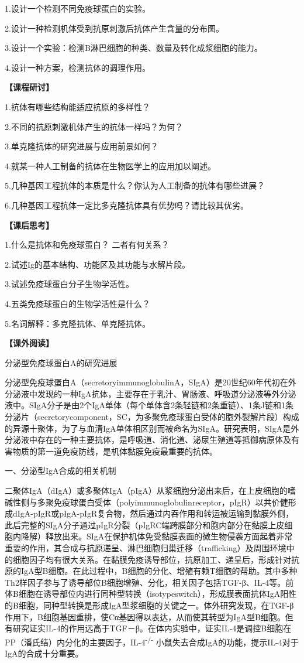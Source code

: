 1.设计一个检测不同免疫球蛋白的实验。

2.设计一种检测机体受到抗原刺激后抗体产生含量的分布图。

3.设计一个实验：检测B淋巴细胞的种类、数量及转化成浆细胞的能力。

4.设计一种方案，检测抗体的调理作用。

\noindent\textbf{【课程研讨】}

1.抗体有哪些结构能适应抗原的多样性？

2.不同的抗原刺激机体产生的抗体一样吗？为何？

3.单克隆抗体的研究进展与应用前景如何？

4.就某一种人工制备的抗体在生物医学上的应用加以阐述。

5.几种基因工程抗体的本质是什么？你认为人工制备的抗体有哪些进展？

6.几种基因工程抗体一定比多克隆抗体具有优势吗？请比较其优劣。

\noindent\textbf{【课后思考】}

1.什么是抗体和免疫球蛋白？ 二者有何关系？

2.试述Ig的基本结构、功能区及其功能与水解片段。

3.试述免疫球蛋白分子生物学活性。

4.五类免疫球蛋白的生物学活性是什么？

5.名词解释：多克隆抗体、单克隆抗体。

\noindent\textbf{【课外阅读】}

\begin{center}
{\Large 分泌型免疫球蛋白A的研究进展}
\end{center}
分泌型免疫球蛋白A（secretoryimmunoglobulinA，SIgA）是20世纪60年代初在外分泌液中发现的一种IgA抗体，主要存在于乳汁、胃肠液、呼吸道分泌液等外分泌液中。SIgA分子是由2个IgA单体（每个单体含2条轻链和2条重链）、1条J链和1条分泌片（secretorycomponent，SC，为多聚免疫球蛋白受体的胞外裂解片段）构成的异源十聚体，为了与血清IgA单体相区别而被命名为SIgA。研究表明，SIgA是外分泌液中存在的一种主要抗体，是呼吸道、消化道、泌尿生殖道等抵御病原体及有害物质的第一道免疫防线，是机体黏膜免疫最重要的抗体。

\begin{center}
{\large 一、分泌型IgA合成的相关机制}
\end{center}
二聚体IgA（dIgA）或多聚体IgA（pIgA）从浆细胞分泌出来后，在上皮细胞的嗜碱性侧与多聚免疫球蛋白受体（polyimmunoglobulinreceptor，pIgR）以共价健形成dIgA-pIgR或pIgA-pIgR复合物，然后通过内吞作用和转运被运输到黏膜外侧，此后完整的SIgA分子通过pIgR分裂（pIgRC端跨膜部分和胞内部分在黏膜上皮细胞内降解）释放出来。SIgA在保护机体免受黏膜表面的微生物侵袭方面起着非常重要的作用，其合成与抗原递呈、淋巴细胞归巢迁移（trafficking）及周围环境中的细胞因子均有很大关系。在黏膜免疫诱导部位，抗原加工、递呈后，形成针对抗原的IgA型B细胞。在此过程中，B细胞的分化、增殖有赖T细胞的帮助。其中多种Th2样因子参与了诱导部位B细胞增殖、分化，相关因子包括TGF-β、IL-4等。前体B细胞在诱导部位内进行同种型转换（isotypeswitch），形成膜表面抗体IgA阳性的B细胞，同种型转换是形成IgA型浆细胞的关键之一。体外研究发现，在TGF-β作用下，B细胞基因重排，使Cα基因得以表达，从而使其转型为IgA型B细胞。但有研究证实IL-4的作用远高于TGF－β。在体内实验中，证实IL-4是调控B细胞在PP（潘氏结）内分化的主要因子，IL-4\textsuperscript{-/-}
小鼠失去合成IgA的功能，提示IL-4对于IgA的合成十分重要。

